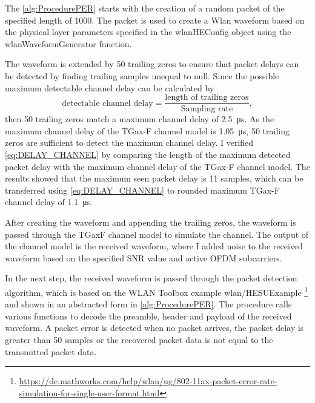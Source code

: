 The \autoref{alg:ProcedurePER} starts with the creation of a random packet of the specified length of \SI{1000}{\byte}.
The packet is used to create a Wlan waveform based on the physical layer parameters specified in the wlanHEConfig object using the wlanWaveformGenerator function.

The waveform is extended by
\num{50} trailing zeros to ensure that packet delays can be detected by finding trailing samples unequal to null.
Since the possible maximum detectable channel delay can be calculated by
\begin{equation}\label{eq:DELAY_CHANNEL}
   \text{detectable channel delay} =
   \frac{
      \text{length of trailing zeros}
   }{
      \text{Sampling rate}
   }
   ,
\end{equation}
then \num{50} trailing zeros match a maximum channel delay of \SI{2.5}{\micro\second}.
As the maximum channel delay of the TGax-F channel model is \SI{1.05}{\micro\second},
\num{50} trailing zeros are sufficient to detect the maximum channel delay.
I verified \autoref{eq:DELAY_CHANNEL} by comparing
the length of the maximum detected packet delay with the maximum channel delay of the TGax-F channel model.
The results showed that the maximum seen packet delay is \num{11} samples,
which can be transferred using \autoref{eq:DELAY_CHANNEL} to rounded maximum TGax-F channel delay of \SI{1.1}{\micro\second}.

After creating the waveform and appending the trailing zeros, the waveform is passed through the TGaxF channel model to simulate the channel.
The output of the channel model is the received waveform, where I added noise to the received waveform based on the
specified \ac{SNR} value and active \ac{OFDM} subcarriers.

In the next step, the received waveform is passed through the packet detection algorithm, which is based on the
WLAN Toolbox example wlan/HESUExample \footnote{\url{https://de.mathworks.com/help/wlan/ug/802-11ax-packet-error-rate-simulation-for-single-user-format.html}} and
shown in an abstracted form in \autoref{alg:ProcedurePER}.
The procedure calls various functions to decode the preamble, header and payload of
the received waveform.
A packet error is detected when no packet arrives, the packet delay is greater than \num{50} samples or the recovered packet data
is not equal to the transmitted packet data.


